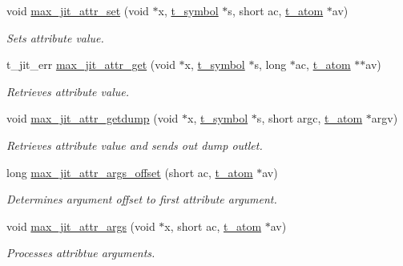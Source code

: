 \begin{DoxyCompactItemize}
\item 
void \hyperlink{group__maxwrapmod_ga022ce3be027665efbf00bcef827c4237}{max\_\-jit\_\-attr\_\-set} (void $\ast$x, \hyperlink{structt__symbol}{t\_\-symbol} $\ast$s, short ac, \hyperlink{structt__atom}{t\_\-atom} $\ast$av)
\begin{DoxyCompactList}\small\item\em Sets attribute value. \item\end{DoxyCompactList}\item 
t\_\-jit\_\-err \hyperlink{group__maxwrapmod_ga842f21afa3ec44bf8c625eb21430fbad}{max\_\-jit\_\-attr\_\-get} (void $\ast$x, \hyperlink{structt__symbol}{t\_\-symbol} $\ast$s, long $\ast$ac, \hyperlink{structt__atom}{t\_\-atom} $\ast$$\ast$av)
\begin{DoxyCompactList}\small\item\em Retrieves attribute value. \item\end{DoxyCompactList}\item 
void \hyperlink{group__maxwrapmod_ga2c14234e428260001a4b5ae40eb07525}{max\_\-jit\_\-attr\_\-getdump} (void $\ast$x, \hyperlink{structt__symbol}{t\_\-symbol} $\ast$s, short argc, \hyperlink{structt__atom}{t\_\-atom} $\ast$argv)
\begin{DoxyCompactList}\small\item\em Retrieves attribute value and sends out dump outlet. \item\end{DoxyCompactList}\item 
long \hyperlink{group__maxwrapmod_ga1a28ddf72d9bdcb2096df36384b63de6}{max\_\-jit\_\-attr\_\-args\_\-offset} (short ac, \hyperlink{structt__atom}{t\_\-atom} $\ast$av)
\begin{DoxyCompactList}\small\item\em Determines argument offset to first attribute argument. \item\end{DoxyCompactList}\item 
void \hyperlink{group__maxwrapmod_gac1ffd4864421154c8e6364b5df9a09ff}{max\_\-jit\_\-attr\_\-args} (void $\ast$x, short ac, \hyperlink{structt__atom}{t\_\-atom} $\ast$av)
\begin{DoxyCompactList}\small\item\em Processes attribtue arguments. \item\end{DoxyCompactList}\item 
$$
\end{DoxyCompactItemize}
